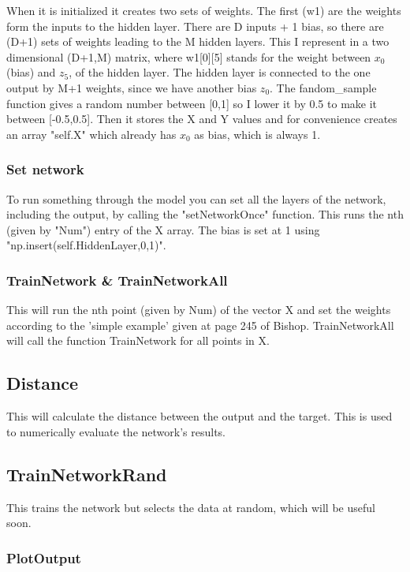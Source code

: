 \documentclass[a4paper]{article}
\begin{document}
When it is initialized it creates two sets of weights. The first (w1) are the weights form the inputs to the hidden layer. There are D inputs + 1 bias, so there are (D+1) sets of weights leading to the M hidden layers. This I represent in a two dimensional (D+1,M) matrix, where w1[0][5] stands for the weight between $x_0$ (bias) and $z_5$, of the hidden layer.
The hidden layer is connected to the one output by M+1 weights, since we have another bias $z_0$. The fandom\_sample function gives a random number between [0,1] so I lower it by 0.5 to make it between [-0.5,0.5].
Then it stores the X and Y values and for convenience creates an array "self.X" which already has $x_0$ as bias, which is always 1.

\subsubsection*{Set network}
To run something through the model you can set all the layers of the network, including the output, by calling the "setNetworkOnce" function. This runs the nth (given by "Num") entry of the X array. The bias is set at 1 using "np.insert(self.HiddenLayer,0,1)".

\subsubsection*{TrainNetwork \& TrainNetworkAll}

This will run the nth point (given by Num) of the vector X and set the weights according to the 'simple example' given at page 245 of Bishop. TrainNetworkAll will call the function TrainNetwork for all points in X.

\subsection*{Distance}

This will calculate the distance between the output and the target. This is used to numerically evaluate the network's results.

\subsection*{TrainNetworkRand}

This trains the network but selects the data at random, which will be useful soon.

\subsubsection*{PlotOutput}
\end{document}
